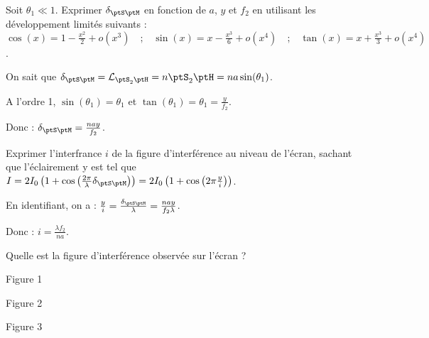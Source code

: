 
\begin{enonce}
	Soit $\theta_1\ll1$. Exprimer $\delta_{\ptS \ptM}$ en fonction de $a$, $y$ et $f_2$ en utilisant les développement limités suivants :
	$
	\cos(x)=1-\frac{x^2}{2}+o(x^3) \quad \text{;} \quad 
	\sin(x)=x-\frac{x^3}{6}+o(x^{4}) \quad \text{;} \quad 
	\tan(x)=x+\frac{x^3}{3}+o(x^{4})$.
\end{enonce}


\begin{corrige}
	On sait que $\delta_{\ptS \ptM}=\mathcal{L}_{\ptS_2 \ptH}=n \ptS_2 \ptH=na \sin(\theta_1)$.

	A l'ordre 1, $\sin(\theta_1)=\theta_1$ et $\tan(\theta_1)=\theta_1=\frac{y}{f_2}$.

	Donc : $\delta_{\ptS \ptM}=\frac{nay}{f_2}$.
\end{corrige}



\begin{enonce}
	Exprimer l'interfrance $i$ de la figure d'interférence au niveau de l'écran, sachant que l'éclairement y est tel que $I = 2I_0\left( 1 + \cos\left( \frac{2 \pi}{\lambda} \delta_{\ptS \ptM} \right) \right) = 2 I_0 \left( 1 + \cos\left(  2\pi\frac{y}{i} \right) \right)$.
\end{enonce}


\begin{corrige}
	En identifiant, on a : $\frac{y}{i}=\frac{\delta_{\ptS \ptM}}{\lambda}=\frac{nay}{f_2 \lambda}$.

	Donc : $i=\frac{\lambda f_2}{na}$.
\end{corrige}




\begin{enonce}
	Quelle est la figure d'interférence observée sur l'écran ?
	\begin{listeQCM3Colonnes}
		\item Figure 1
		\item Figure 2
		\item Figure 3
		\end{listeQCM3Colonnes}
		\smallskip
\end{enonce}
	
